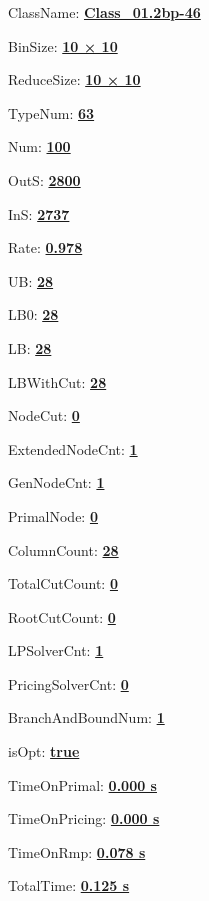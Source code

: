 \documentclass[11pt]{article}
\begin{document}
\pagestyle{empty}


ClassName: \underline{\textbf{Class_01.2bp-46}}
\par
BinSize: \underline{\textbf{10 × 10}}
\par
ReduceSize: \underline{\textbf{10 × 10}}
\par
TypeNum: \underline{\textbf{63}}
\par
Num: \underline{\textbf{100}}
\par
OutS: \underline{\textbf{2800}}
\par
InS: \underline{\textbf{2737}}
\par
Rate: \underline{\textbf{0.978}}
\par
UB: \underline{\textbf{28}}
\par
LB0: \underline{\textbf{28}}
\par
LB: \underline{\textbf{28}}
\par
LBWithCut: \underline{\textbf{28}}
\par
NodeCut: \underline{\textbf{0}}
\par
ExtendedNodeCnt: \underline{\textbf{1}}
\par
GenNodeCnt: \underline{\textbf{1}}
\par
PrimalNode: \underline{\textbf{0}}
\par
ColumnCount: \underline{\textbf{28}}
\par
TotalCutCount: \underline{\textbf{0}}
\par
RootCutCount: \underline{\textbf{0}}
\par
LPSolverCnt: \underline{\textbf{1}}
\par
PricingSolverCnt: \underline{\textbf{0}}
\par
BranchAndBoundNum: \underline{\textbf{1}}
\par
isOpt: \underline{\textbf{true}}
\par
TimeOnPrimal: \underline{\textbf{0.000 s}}
\par
TimeOnPricing: \underline{\textbf{0.000 s}}
\par
TimeOnRmp: \underline{\textbf{0.078 s}}
\par
TotalTime: \underline{\textbf{0.125 s}}
\par
\newpage


\end{document}
